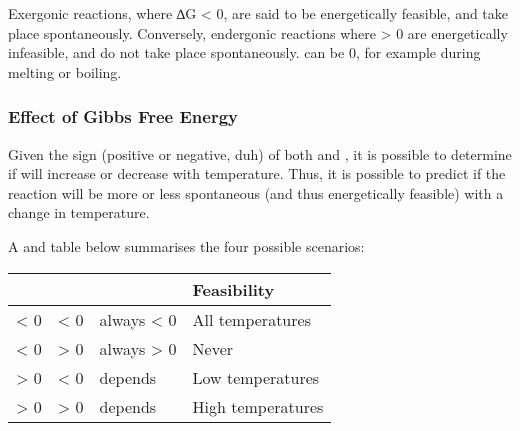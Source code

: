 			Exergonic reactions, where ∆G < 0, are said to be energetically feasible, and take place spontaneously. Conversely, endergonic
			reactions where \gibb{} > 0 are energetically infeasible, and do not take place spontaneously. \gibb{} can be 0, for example during
			melting or boiling.


			\subsubsection{Effect of Gibbs Free Energy}

				Given the sign (positive or negative, duh) of both \enth{} and \entr{}, it is possible to determine if \gibb{} will increase
				or decrease with temperature. Thus, it is possible to predict if the reaction will be more or less spontaneous
				(and thus energetically feasible) with a change in temperature.

				A  and  table below summarises the four possible scenarios:

				\begin{center}\begin{table}[htb]\renewcommand{\arraystretch}{1.5}
				\begin{tabu} to \textwidth {| X[c,m] | X[c,m] | X[c,m] | X[c,m] |}

					\hline		\enth{}		&	\entr{}		&	\gibb{}		&		Feasibility			\\

					\hline		< 0			&	< 0			&	always < 0	&		All temperatures	\\
					\hline		< 0			&	> 0			&	always > 0	&				Never		\\
					\hline		> 0			&	< 0			&	depends		&		Low temperatures	\\
					\hline		> 0			&	> 0			&	depends		&		High temperatures	\\
					\hline

				\end{tabu}
				\end{table}\end{center}\vspace{-10mm}





















































